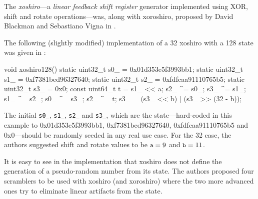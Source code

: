     The \emph{xoshiro}---a \emph{linear feedback shift register} generator implemented using XOR, shift and rotate operations---was, along with xoroshiro, proposed by David Blackman and Sebastiano Vigna in \cite{Blackman:2018}.

    The following (slightly modified) implementation of a \SI{32}{\bit} xoshiro with a \SI{128}{\bit} state was given in \cite{Blackman:2018}:
\begin{@empty}
    \lstset{
        language = [ISO]C++
    }
\begin{centeredshadowboxlisting}
void xoshiro128() {
    static uint32_t s0_ = 0x01d353e5f3993bb1;
    static uint32_t s1_ = 0xf7381bed96327640;
    static uint32_t s2_ = 0xfdfcaa91110765b5;
    static uint32_t s3_ = 0x0;
    const uint64_t t = s1_ << a;
    s2_ ^= s0_;
    s3_ ^= s1_;
    s1_ ^= s2_;
    s0_ ^= s3_;
    s2_ ^= t;
    s3_ = (s3_ << b) | (s3_ >> (32 - b));
}
\end{centeredshadowboxlisting}
\end{@empty}
    \textcolor{black!75}{The initial \lstinline|s0_|, \lstinline|s1_|, \lstinline|s2_| and \lstinline|s3_|, which are the state---hard-coded in this example to 0x01d353e5f3993bb1, 0xf7381bed96327640, 0xfdfcaa91110765b5 and 0x0---should be randomly seeded in any real use case.} For the \SI{32}{\bit} case, the authors suggested shift and rotate values to be $\texttt{\small a} = 9$ and $\texttt{\small b} = 11$.

    It is easy to see in the implementation that xoshiro does not define the generation of a pseudo-random number from its state. The authors proposed four scramblers to be used with xoshiro (and xoroshiro) where the two more advanced ones try to eliminate linear artifacts from the state.
    
